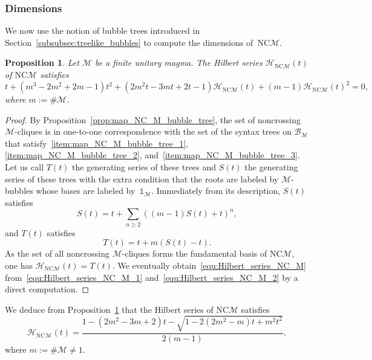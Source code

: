 \documentclass[10pt,reqno]{amsart}
\numberwithin{equation}{subsection}
\renewcommand{\geq}{\geqslant}
\newtheorem{Proposition}[Theorem]{Proposition}
\newcommand{\Mca}{\mathcal{M}}
\newcommand{\NC}{\mathrm{NC}}
\newcommand{\Unit}{\mathds{1}}
\newcommand{\Hilbert}{\mathcal{H}}
\newcommand{\Bubbles}{\mathcal{B}}
\begin{document}
\subsubsection{Dimensions}
We now use the notion of bubble trees introduced in
Section~\ref{subsubsec:treelike_bubbles} to compute the dimensions
of~$\NC\Mca$.
\medskip

\begin{Proposition} \label{prop:Hilbert_series_NC_M}
    Let $\Mca$ be a finite unitary magma. The Hilbert series
    $\Hilbert_{\NC\Mca}(t)$ of $\NC\Mca$ satisfies
    \begin{equation} \label{equ:Hilbert_series_NC_M}
        t + \left(m^3 - 2m^2 + 2m - 1\right)t^2
        + \left(2m^2t - 3mt + 2t - 1\right) \Hilbert_{\NC\Mca}(t)
        + \left(m - 1\right) \Hilbert_{\NC\Mca}(t)^2
        = 0,
    \end{equation}
    where $m := \# \Mca$.
\end{Proposition}
\begin{proof}
    By Proposition~\ref{prop:map_NC_M_bubble_tree}, the set of
    noncrossing $\Mca$-cliques is in one-to-one correspondence with the
    set of the syntax trees on $\Bubbles_\Mca$ that
    satisfy~\ref{item:map_NC_M_bubble_tree_1},
    \ref{item:map_NC_M_bubble_tree_2},
    and~\ref{item:map_NC_M_bubble_tree_3}. Let us call $T(t)$ the
    generating series of these trees and $S(t)$ the generating series of
    these trees with the extra condition that the roots are labeled by
    $\Mca$-bubbles whose bases are labeled by~$\Unit_\Mca$. Immediately
    from its description, $S(t)$ satisfies
    \begin{equation} \label{equ:Hilbert_series_NC_M_1}
        S(t) = t + \sum_{n \geq 2} \left((m - 1) S(t) + t\right)^n,
    \end{equation}
    and $T(t)$ satisfies
    \begin{equation} \label{equ:Hilbert_series_NC_M_2}
        T(t) = t + m (S(t) - t).
    \end{equation}
    As the set of all noncrossing $\Mca$-cliques forms the fundamental
    basis of $\NC\Mca$, one has $\Hilbert_{\NC\Mca}(t) = T(t)$. We
    eventually obtain~\eqref{equ:Hilbert_series_NC_M}
    from~\eqref{equ:Hilbert_series_NC_M_1}
    and~\eqref{equ:Hilbert_series_NC_M_2} by a direct computation.
\end{proof}
\medskip

We deduce from Proposition~\ref{prop:Hilbert_series_NC_M} that the
Hilbert series of $\NC\Mca$ satisfies
\begin{equation} \label{equ:Hilbert_series_NC_M_function}
    \Hilbert_{\NC\Mca}(t) =
    \frac{1 - (2m^2 - 3m + 2)t - \sqrt{1 - 2(2m^2 - m)t + m^2t^2}}
    {2(m - 1)},
\end{equation}
where $m := \# \Mca \ne 1$.
\medskip
\end{document}

